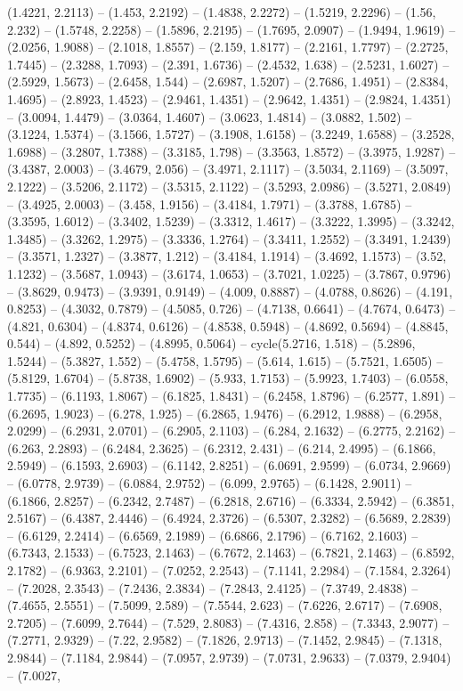 (1.4221, 2.2113) -- (1.453, 2.2192) -- (1.4838, 2.2272) -- (1.5219, 2.2296) -- (1.56, 2.232) -- (1.5748, 2.2258) -- (1.5896, 2.2195) -- (1.7695, 2.0907) -- (1.9494, 1.9619) -- (2.0256, 1.9088) -- (2.1018, 1.8557) -- (2.159, 1.8177) -- (2.2161, 1.7797) -- (2.2725, 1.7445) -- (2.3288, 1.7093) -- (2.391, 1.6736) -- (2.4532, 1.638) -- (2.5231, 1.6027) -- (2.5929, 1.5673) -- (2.6458, 1.544) -- (2.6987, 1.5207) -- (2.7686, 1.4951) -- (2.8384, 1.4695) -- (2.8923, 1.4523) -- (2.9461, 1.4351) -- (2.9642, 1.4351) -- (2.9824, 1.4351) -- (3.0094, 1.4479) -- (3.0364, 1.4607) -- (3.0623, 1.4814) -- (3.0882, 1.502) -- (3.1224, 1.5374) -- (3.1566, 1.5727) -- (3.1908, 1.6158) -- (3.2249, 1.6588) -- (3.2528, 1.6988) -- (3.2807, 1.7388) -- (3.3185, 1.798) -- (3.3563, 1.8572) -- (3.3975, 1.9287) -- (3.4387, 2.0003) -- (3.4679, 2.056) -- (3.4971, 2.1117) -- (3.5034, 2.1169) -- (3.5097, 2.1222) -- (3.5206, 2.1172) -- (3.5315, 2.1122) -- (3.5293, 2.0986) -- (3.5271, 2.0849) -- (3.4925, 2.0003) -- (3.458, 1.9156) -- (3.4184, 1.7971) -- (3.3788, 1.6785) -- (3.3595, 1.6012) -- (3.3402, 1.5239) -- (3.3312, 1.4617) -- (3.3222, 1.3995) -- (3.3242, 1.3485) -- (3.3262, 1.2975) -- (3.3336, 1.2764) -- (3.3411, 1.2552) -- (3.3491, 1.2439) -- (3.3571, 1.2327) -- (3.3877, 1.212) -- (3.4184, 1.1914) -- (3.4692, 1.1573) -- (3.52, 1.1232) -- (3.5687, 1.0943) -- (3.6174, 1.0653) -- (3.7021, 1.0225) -- (3.7867, 0.9796) -- (3.8629, 0.9473) -- (3.9391, 0.9149) -- (4.009, 0.8887) -- (4.0788, 0.8626) -- (4.191, 0.8253) -- (4.3032, 0.7879) -- (4.5085, 0.726) -- (4.7138, 0.6641) -- (4.7674, 0.6473) -- (4.821, 0.6304) -- (4.8374, 0.6126) -- (4.8538, 0.5948) -- (4.8692, 0.5694) -- (4.8845, 0.544) -- (4.892, 0.5252) -- (4.8995, 0.5064) -- cycle(5.2716, 1.518) -- (5.2896, 1.5244) -- (5.3827, 1.552) -- (5.4758, 1.5795) -- (5.614, 1.615) -- (5.7521, 1.6505) -- (5.8129, 1.6704) -- (5.8738, 1.6902) -- (5.933, 1.7153) -- (5.9923, 1.7403) -- (6.0558, 1.7735) -- (6.1193, 1.8067) -- (6.1825, 1.8431) -- (6.2458, 1.8796) -- (6.2577, 1.891) -- (6.2695, 1.9023) -- (6.278, 1.925) -- (6.2865, 1.9476) -- (6.2912, 1.9888) -- (6.2958, 2.0299) -- (6.2931, 2.0701) -- (6.2905, 2.1103) -- (6.284, 2.1632) -- (6.2775, 2.2162) -- (6.263, 2.2893) -- (6.2484, 2.3625) -- (6.2312, 2.431) -- (6.214, 2.4995) -- (6.1866, 2.5949) -- (6.1593, 2.6903) -- (6.1142, 2.8251) -- (6.0691, 2.9599) -- (6.0734, 2.9669) -- (6.0778, 2.9739) -- (6.0884, 2.9752) -- (6.099, 2.9765) -- (6.1428, 2.9011) -- (6.1866, 2.8257) -- (6.2342, 2.7487) -- (6.2818, 2.6716) -- (6.3334, 2.5942) -- (6.3851, 2.5167) -- (6.4387, 2.4446) -- (6.4924, 2.3726) -- (6.5307, 2.3282) -- (6.5689, 2.2839) -- (6.6129, 2.2414) -- (6.6569, 2.1989) -- (6.6866, 2.1796) -- (6.7162, 2.1603) -- (6.7343, 2.1533) -- (6.7523, 2.1463) -- (6.7672, 2.1463) -- (6.7821, 2.1463) -- (6.8592, 2.1782) -- (6.9363, 2.2101) -- (7.0252, 2.2543) -- (7.1141, 2.2984) -- (7.1584, 2.3264) -- (7.2028, 2.3543) -- (7.2436, 2.3834) -- (7.2843, 2.4125) -- (7.3749, 2.4838) -- (7.4655, 2.5551) -- (7.5099, 2.589) -- (7.5544, 2.623) -- (7.6226, 2.6717) -- (7.6908, 2.7205) -- (7.6099, 2.7644) -- (7.529, 2.8083) -- (7.4316, 2.858) -- (7.3343, 2.9077) -- (7.2771, 2.9329) -- (7.22, 2.9582) -- (7.1826, 2.9713) -- (7.1452, 2.9845) -- (7.1318, 2.9844) -- (7.1184, 2.9844) -- (7.0957, 2.9739) -- (7.0731, 2.9633) -- (7.0379, 2.9404) -- (7.0027, 